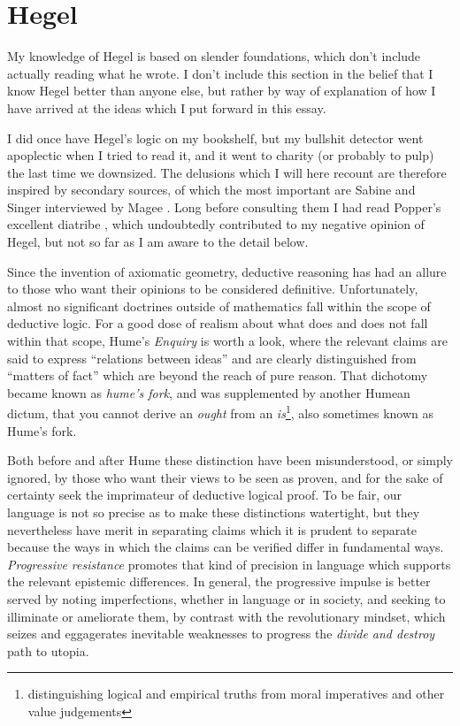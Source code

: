 \documentclass[10pt,titlepage]{book}
\begin{document}
\section{Hegel}

My knowledge of Hegel is based on slender foundations, which don't include actually reading what he wrote.
I don't include this section in the belief that I know Hegel better than anyone else, but rather by way of explanation of how I have arrived at the ideas which I put forward in this essay.

I did once have Hegel's logic on my bookshelf, but my bullshit detector went apoplectic when I tried to read it, and it went to charity (or probably to pulp) the last time we downsized.
The delusions which I will here recount are therefore inspired by secondary sources, of which the most important are Sabine \cite{sabine63} and Singer interviewed by Magee \cite{magee-singer}.
Long before consulting them I had read Popper's excellent diatribe \cite{popper-ose}, which undoubtedly contributed to my negative opinion of Hegel, but not so far as I am aware to the detail below.

Since the invention of axiomatic geometry, deductive reasoning has had an allure to those who want their opinions to be considered definitive.
Unfortunately, almost no significant doctrines outside of mathematics fall within the scope of deductive logic.
For a good dose of realism about what does and does not fall within that scope, Hume's \emph{Enquiry} \cite{humeECHU} is worth a look, where the relevant claims are said to express ``relations between ideas'' and are clearly distinguished from ``matters of fact'' which are beyond the reach of pure reason.
That dichotomy became known as \emph{hume's fork}, and was supplemented by another Humean dictum, that you cannot derive an \emph{ought} from an \emph{is}\footnote{distinguishing logical and empirical truths from moral imperatives and other value judgements}, also sometimes known as Hume's fork.

Both before and after Hume these distinction have been misunderstood, or simply ignored, by those who want their views to be seen as proven, and for the sake of certainty seek the imprimateur of deductive logical proof.
To be fair, our language is not so precise as to make these distinctions watertight, but they nevertheless have merit in separating claims which it is prudent to separate because the ways in which the claims can be verified differ in fundamental ways.
\emph{Progressive resistance} promotes that kind of precision in language which supports the relevant epistemic differences.
In general, the progressive impulse is better served by noting imperfections, whether in language or in society, and seeking to illiminate or ameliorate them, by contrast with the revolutionary mindset, which seizes and eggagerates inevitable weaknesses to progress the \emph{divide and destroy} path to utopia.
\end{document}
